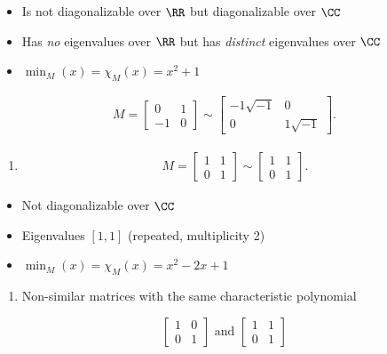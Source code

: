 \begin{itemize}
\item
  Is not diagonalizable over \(\RR\) but diagonalizable over \(\CC\)
\item
  Has \emph{no} eigenvalues over \(\RR\) but has \emph{distinct}
  eigenvalues over \(\CC\)
\item
  \(\min_M(x) = \chi_M(x) = x^2 + 1\)
\end{itemize}

\begin{align*}
M = \left[\begin{array}{rr}
0  & 1 \\
-1 & 0
\end{array}\right] \sim
\left[\begin{array}{r|r}
-1 \sqrt{-1} & 0 \\
\hline
0 & 1 \sqrt{-1}
\end{array}\right]
.\end{align*}

\begin{enumerate}
\def\labelenumi{\arabic{enumi}.}
\setcounter{enumi}{1}
\tightlist
\item
  \begin{align*}
  M = \left[\begin{array}{rr}
  1 & 1 \\
  0 & 1
  \end{array}\right] \sim
  \left[\begin{array}{rr}
  1 & 1 \\
  0 & 1
  \end{array}\right]
  .\end{align*}
\end{enumerate}

\begin{itemize}
\item
  Not diagonalizable over \(\CC\)
\item
  Eigenvalues \([1, 1]\) (repeated, multiplicity 2)
\item
  \(\min_M(x) = \chi_M(x) = x^2-2x+1\)
\end{itemize}

\begin{enumerate}
\def\labelenumi{\arabic{enumi}.}
\setcounter{enumi}{2}
\tightlist
\item
  Non-similar matrices with the same characteristic polynomial
\end{enumerate}

\[
\left[\begin{array}{ll}
{1}  & {0} \\
{0} & {1}
 \end{array}\right]
 \text { and }
 \left[\begin{array}{ll}
 {1} & {1} \\
 {0} & {1}
  \end{array}\right]
\]

